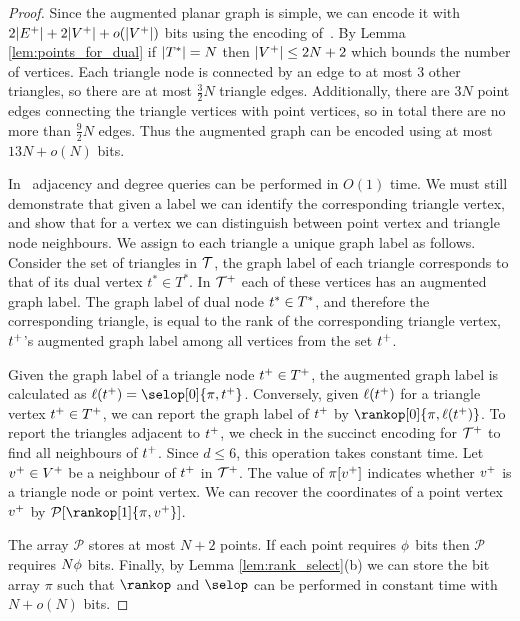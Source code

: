 \begin{proof}
Since the augmented planar graph is simple, we can encode it with 
$2|E^+| + 2|V^+| + o(|V^+|)$ bits 
using the encoding of~\cite{DBLP:journals/siamcomp/ChiangLL05}. 
By Lemma \ref{lem:points_for_dual} if $|T^*| = N$ then 
$|V^+| \le 2N+2$ which bounds the number of vertices. 
Each triangle node is connected by an edge to at most $3$ 
other triangles, so there are at most $\frac{3}{2} N$ triangle edges. 
Additionally, there are $3N$ point edges connecting the 
triangle vertices with point vertices, so in total there are no 
more than $\frac{9}{2}N$ edges. 
Thus the augmented graph can be encoded using at most $13N + o(N)$ bits. 

In~\cite{DBLP:journals/siamcomp/ChiangLL05} adjacency and degree queries
 can be performed in $O(1)$ time. 
We must still demonstrate that given a label we can identify the corresponding 
triangle vertex, and show that for a vertex we can distinguish between point 
vertex and triangle node neighbours. 
We assign to each triangle a unique graph label as follows. 
Consider the set of triangles in $\mathcal{T}$, the graph label of each 
triangle corresponds to that of its dual vertex $t^* \in T^*$. 
In $\mathcal{T}^+$ each of these vertices has an augmented graph label.  
The graph label of dual node $t^* \in T^*$, and therefore the 
corresponding triangle, is equal to the rank of the corresponding 
triangle vertex, $t^+$'s augmented graph label among all 
vertices from the set $t^+$. 

Given the graph label of a triangle node $t^+ \in T^+$,
 the augmented graph label is calculated as $\ell(t^{\augdualsym}) = 
\selop[0]{\pi, \augdual{t}}$.
Conversely, given $\ell(t^+)$ for a triangle vertex 
$t^+ \in T^+$, we can report the graph label 
of $t^+$ by $\rankop[0]{\pi,\ell(\augdual{t})}$. 
To report the triangles adjacent to $t^+$, we check in 
the succinct encoding for $\mathcal{T}^+$ to find all neighbours of 
$t^+$. 
Since $d \le 6$, this operation takes constant time. 
Let $v^+ \in V^+$ be a neighbour of $t^+$ in 
$\mathcal{T}^+$. 
The value of $\pi[v^+]$ indicates whether $v^+$ is a 
triangle node or point vertex. 
We can recover the coordinates of a point vertex $v^+$ by 
$\mathcal{P}[\rankop[1]{\pi,\augdual{v}}]$.

The array $\mathcal{P}$ stores at most $N+2$ points. 
If each point requires $\phi$ bits then $\mathcal{P}$ 
requires $N\phi$ bits. 
Finally, by Lemma \ref{lem:rank_select}(b) we can store the bit array 
$\pi$ such that $\rankop$ and $\selop$ can be performed in constant time 
with $N + o(N)$ bits.
\end{proof}

